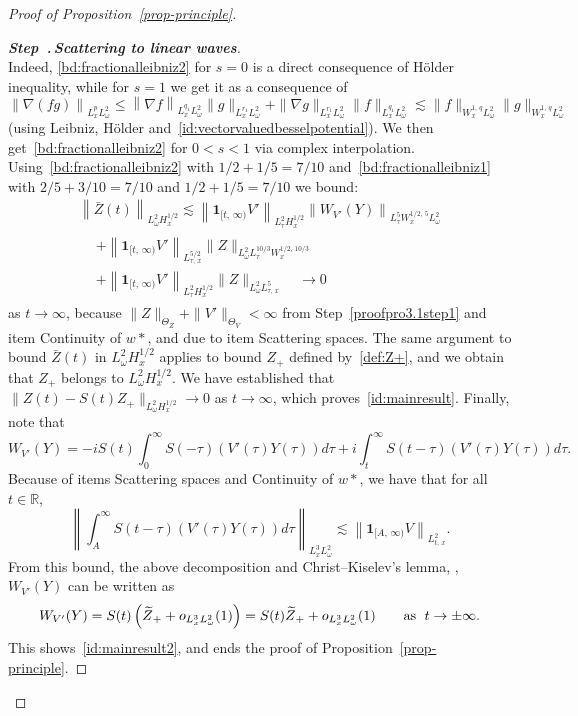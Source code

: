 \documentclass[10pt]{amsart}
\theoremstyle{definition}\newtheorem{defi}[theo]{Definition}\newtheorem{rema}[theo]{Remark}\newtheorem{exam}[theo]{Example}\newtheorem{exem}[theo]{Example}\newtheorem{nota}[theo]{Notation}
\newcommand{\R}{\mathbb{R}}
\newcommand{\bfun}{\mathbf{1}}
\newcounter{stepcount}
\newenvironment{step}[1]{\refstepcounter{stepcount}\begin{proof}[{\bf{Step~\thestepcount}{.\,\emph{#1}}}]}{\let\qed\relax\end{proof}}
\let\oldtilde\tilde
\renewcommand*{\tilde}[1]{\mathchoice{\widetilde{#1}}{\widetilde{#1}}{\oldtilde{#1}}{\oldtilde{#1}}}
\begin{document}
\begin{proof}[Proof of Proposition~\ref{prop-principle}]
\begin{step}{{Scattering to linear waves}}
\begin{equation}
\end{equation}
Indeed, \eqref{bd:fractionalleibniz2} for $s=0$ is a direct consequence of H\"older inequality, while for $s=1$ we get it as a consequence of
\[
\left\| \nabla (fg) \right\|_{L^p_x L^2_\omega}\leq \left\| \nabla f \right\|_{L^{q_1}_x L^2_\omega}\| g \|_{L^{r_1}_x L^2_\omega}+\| \nabla g \|_{L^{r_1}_x L^2_\omega}\| f \|_{L^{q_1}_x L^2_\omega}\lesssim \| f \|_{W^{1,\,q}_xL^2_\omega} \| g \|_{W^{1,\,q}_xL^2_\omega}
\]
(using Leibniz, H\"older and~\eqref{id:vectorvaluedbesselpotential}). We then get~\eqref{bd:fractionalleibniz2} for $0<s<1$ via complex interpolation. Using~\eqref{bd:fractionalleibniz2} with $1/2+1/5=7/10$ and~\eqref{bd:fractionalleibniz1} with $2/5+3/10=7/10$ and $1/2+1/5=7/10$ we bound:
\begin{multline*}
\left\| \bar Z(t)\right\|_{L^2_\omega H^{1/2}_x}
 \lesssim \left\|\bfun_{[t,\,\infty)}V'\right\|_{L^2_{\tau}H^{1/2}_x} \left\|W_{V'}(Y)\right\|_{L^{5}_\tau W^{1/2,\,5}_x L^2_\omega}\\
\begin{aligned}
&+ \left\|\bfun_{[t,\,\infty)}V'\right\|_{L^{5/2}_{\tau,\,x}} \|Z\|_{L^2_\omega L^{10/3}_\tau W^{1/2,\,10/3}_x}\\
&+ \left\|\bfun_{[t,\,\infty)}V'\right\|_{L^{2}_{\tau}H^{1/2}_x } \|Z\|_{L^2_\omega L^{5}_{\tau,\,x}} \quad \longrightarrow 0
\end{aligned}
\end{multline*}
as $t\rightarrow \infty$, because $\| Z \|_{\Theta_Z}+\| V' \|_{\Theta_V}<\infty$ from Step~\ref{proofpro3.1step1} and item Continuity of $w*$, and due to item Scattering spaces. The same argument to bound $\bar Z(t)$ in $L^2_\omega H^{1/2}_x$ applies to bound $Z_+$ defined by~\eqref{def:Z+}, and we obtain that $Z_+$ belongs to $L^2_\omega H^{1/2}_x$. We have established that $ \|Z(t) - S(t)Z_+\|_{L^2_{\omega} H^{1/2}_x}\rightarrow 0$ as $t\rightarrow \infty$, which proves~\eqref{id:mainresult}. Finally, note that
\[
W_{V'}(Y) = -iS(t)\int_{0}^\infty S(-\tau) (V'(\tau) Y(\tau)) d\tau + i\int_{t}^\infty S(t-\tau) (V'(\tau) Y(\tau)) d\tau.
\]
Because of items Scattering spaces and Continuity of $w*$, we have that for all $t \in \R$,
\[
\left\|\int_{A}^\infty S(t-\tau) \left(V'(\tau) Y(\tau)\right) d\tau \right\|_{L^3_x L^2_\omega} \lesssim \left\|\bfun_{[A,\,\infty)} V\right\|_{L^2_{t,\,x}}.
\]
From this bound, the above decomposition and Christ--Kiselev's lemma, \cite{ChKi}, $W_{V'}(Y)$ can be written as
\[
W_{V'}(Y) = S(t)\left(\tilde Z_++ o_{L^3_x L^2_\omega}(1)\right) = S(t) \tilde Z_+ + o_{L^3_x L^2_\omega}(1)\qquad \text{as }\; t\rightarrow \pm \infty.
\]
This shows~\eqref{id:mainresult2}, and ends the proof of Proposition~\ref{prop-principle}.
\end{step}
\end{proof}
\end{document}
